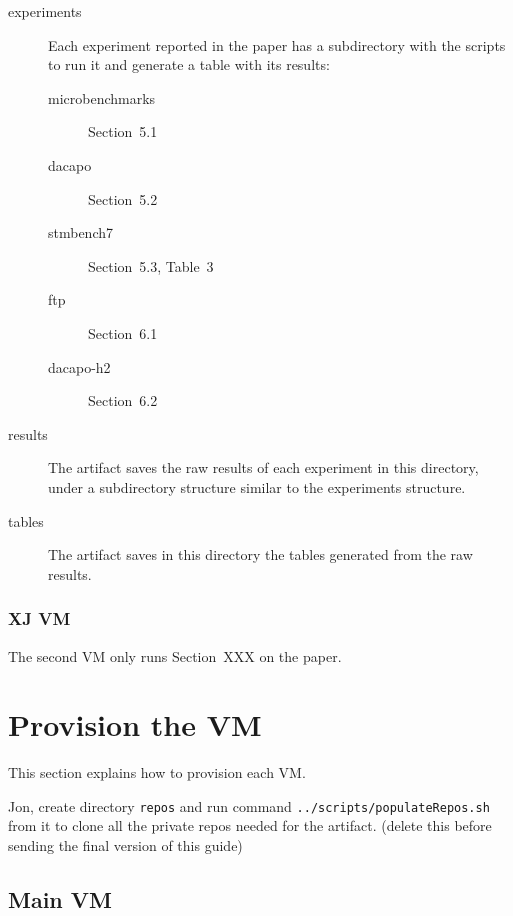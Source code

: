 \documentclass[12pt]{article}
\begin{document}
\begin{description}
    \item[experiments]  Each experiment reported in the paper has a
        subdirectory with the scripts to run it and generate a table with its
        results:

        \begin{description}

            \item[microbenchmarks] Section~5.1

            \item[dacapo] Section~5.2

            \item[stmbench7] Section~5.3, Table~3

            \item[ftp] Section~6.1

            \item[dacapo-h2] Section~6.2

        \end{description}

    \item[results]  The artifact saves the raw results of each experiment in
        this directory, under a subdirectory structure similar to the
        experiments structure.

    \item[tables]  The artifact saves in this directory the tables generated
        from the raw results.

\end{description}

\subsubsection{XJ VM}

The second VM only runs Section~XXX on the paper.

\section{Provision the VM}

This section explains how to provision each VM.

Jon, create directory \texttt{repos} and run command
\texttt{../scripts/populateRepos.sh} from it to clone all the private repos
needed for the artifact. (delete this before sending the final version of this
guide)

\subsection{Main VM}
\end{document}
